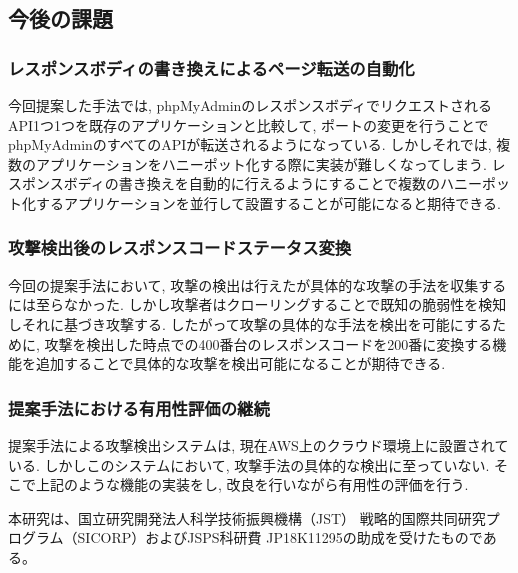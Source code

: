 \documentclass[submit,techrep,noauthor]{ipsj}
\begin{document}
\subsection{今後の課題}

\subsubsection{レスポンスボディの書き換えによるページ転送の自動化}
今回提案した手法では, phpMyAdminのレスポンスボディでリクエストされるAPI1つ1つを既存のアプリケーションと比較して, ポートの変更を行うことでphpMyAdminのすべてのAPIが転送されるようになっている. しかしそれでは, 複数のアプリケーションをハニーポット化する際に実装が難しくなってしまう. レスポンスボディの書き換えを自動的に行えるようにすることで複数のハニーポット化するアプリケーションを並行して設置することが可能になると期待できる.

\subsubsection{攻撃検出後のレスポンスコードステータス変換}
今回の提案手法において, 攻撃の検出は行えたが具体的な攻撃の手法を収集するには至らなかった. しかし攻撃者はクローリングすることで既知の脆弱性を検知しそれに基づき攻撃する. したがって攻撃の具体的な手法を検出を可能にするために, 攻撃を検出した時点での400番台のレスポンスコードを200番に変換する機能を追加することで具体的な攻撃を検出可能になることが期待できる.

\subsubsection{提案手法における有用性評価の継続}
提案手法による攻撃検出システムは, 現在AWS\cite{label9}上のクラウド環境上に設置されている. しかしこのシステムにおいて, 攻撃手法の具体的な検出に至っていない. そこで上記のような機能の実装をし, 改良を行いながら有用性の評価を行う.\\
\vspace{1pc}
\noindent
\begin{acknowledgment}
本研究は、国立研究開発法人科学技術振興機構（JST） 戦略的国際共同研究プログラム（SICORP）およびJSPS科研費 JP18K11295の助成を受けたものである。
\end{acknowledgment}
\end{document}
